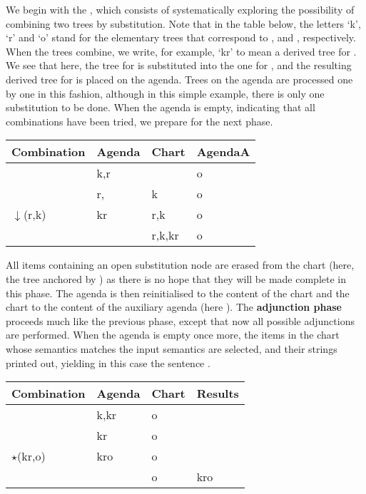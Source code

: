 We begin with the , which consists of
systematically exploring the possibility of combining two trees by
substitution.  Note that in the table below, the letters `k', `r' and
`o' stand for the elementary trees that correspond to
,  and ,
respectively.  When the trees combine, we write, for example, `kr' to
mean a derived tree for .  We see that here, the
tree for  is substituted into the one for
, and the resulting derived tree for
 is placed on the agenda.  Trees on the agenda
are processed one by one in this fashion, although in this simple
example, there is only one substitution to be done.  When the agenda is
empty, indicating that all combinations have been tried, we prepare for
the next phase.

\begin{center}
{\footnotesize
\begin{tabular}{|p{6em}|p{9em}|p{9em}|p{4em}|}
\hline
Combination       & Agenda & Chart  & AgendaA  \\
\hline
                  & k,r    &        & o \\
                  & r,     & k      & o \\
$\downarrow$(r,k) & kr     & r,k    & o \\
                  &        & r,k,kr & o \\
\hline
\end{tabular}}
\end{center}

All items containing an open substitution node are erased from the
chart (here, the tree anchored by ) as there is
no hope that they will be made complete in this phase.
The agenda
is then reinitialised to the content of the chart and the chart to the
content of the auxiliary agenda (here ).
The \textbf{adjunction phase} proceeds much like the previous phase,
except that now all possible adjunctions are performed.  When
the agenda is empty once more, the items in the chart whose semantics
matches the input semantics are selected, and their strings printed
out, yielding in this case the sentence .

\begin{center}
{\footnotesize
\begin{tabular}{|p{6em}|p{9em}|p{6em}|p{4em}|}
\hline
Combination   & Agenda & Chart  & Results  \\
\hline
              & k,kr   & o      &          \\
              & kr     & o      &          \\
$\star$(kr,o) & kro    & o      &          \\
              &        & o      & kro      \\
\hline
\end{tabular}}
\end{center}

